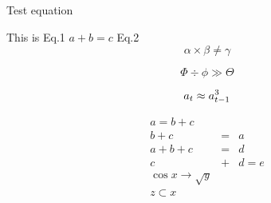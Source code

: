 \documentclass[12pt]{article}
\begin{document}
	Test equation
	
	This is Eq.1 $a + b = c$
	Eq.2  \[\alpha \times \beta \neq \gamma\]
	
	\setcounter{equation}{2}
	\begin{equation}
		\Phi \div \phi \gg \Theta
	\end{equation}
	
	\begin{equation}
		\setcounter{equation}{6}
		a_{t} \approx a_{t-1}^{3}
	\end{equation}
	
	\setcounter{equation}{10}
	\begin{eqnarray}
		a = b + c\\
		b + c &=& a \nonumber \\
		a + b + c &=& d\\
		c &+& d = e\\
		\cos x \rightarrow \sqrt{y}\\
		z \subset x\\
	\end{eqnarray}
\end{document}
